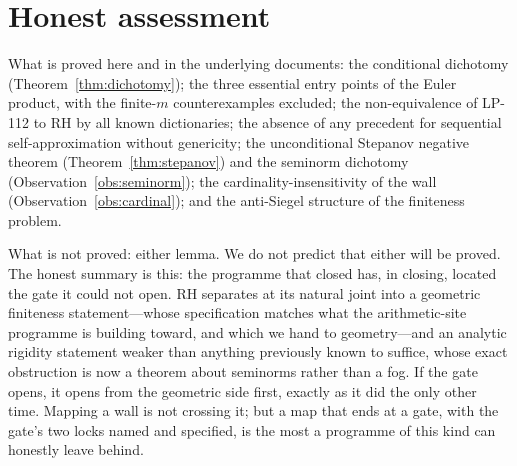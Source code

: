 \documentclass[11pt]{amsart}
\theoremstyle{definition}
\theoremstyle{remark}
\begin{document}
\section{Honest assessment}\label{sec:assessment}

What is proved here and in the underlying documents: the conditional
dichotomy (Theorem~\ref{thm:dichotomy}); the three essential entry points
of the Euler product, with the finite-$m$ counterexamples excluded; the
non-equivalence of LP-112 to RH by all known dictionaries; the absence of
any precedent for sequential self-approximation without genericity; the
unconditional Stepanov negative theorem (Theorem~\ref{thm:stepanov}) and
the seminorm dichotomy (Observation~\ref{obs:seminorm}); the
cardinality-insensitivity of the wall (Observation~\ref{obs:cardinal});
and the anti-Siegel structure of the finiteness problem.

What is not proved: either lemma. We do not predict that either will be
proved. The honest summary is this: the programme that \cite{P43} closed
has, in closing, located the gate it could not open. RH separates at its
natural joint into a geometric finiteness statement---whose specification
matches what the arithmetic-site programme is building toward, and which we
hand to geometry---and an analytic rigidity statement weaker than anything
previously known to suffice, whose exact obstruction is now a theorem about
seminorms rather than a fog. If the gate opens, it opens from the geometric
side first, exactly as it did the only other time. Mapping a wall is not
crossing it; but a map that ends at a gate, with the gate's two locks named
and specified, is the most a programme of this kind can honestly leave
behind.
\end{document}
